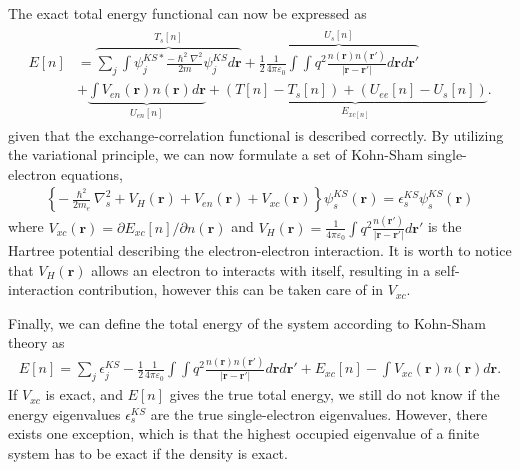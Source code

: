 The exact total energy functional can now be expressed as
\begin{align}
  \begin{aligned}
  E[n]
  &= \overbrace{\sum_j \int \psi_j^{KS*} \frac{-\hslash^2\nabla^2}{2m} \psi_j^{KS}d\boldsymbol{r}}^{T_s[n]} + \overbrace{\frac{1}{2}\frac{1}{4\pi\varepsilon_0}\int \int q^2\frac{n(\boldsymbol{r})n(\boldsymbol{r}')}{\lvert \boldsymbol{r}-\boldsymbol{r}'\rvert} d\boldsymbol{r}d\boldsymbol{r}'}^{U_s[n]}
  \\ &+ \underbrace{\int V_{en}(\boldsymbol{r})n(\boldsymbol{r})d\boldsymbol{r}}_{U_{en}[n]} + \underbrace{\left(T[n] - T_s[n] \right) + \left( U_{ee}[n] - U_s[n] \right)}_{E_{xc[n]}}.
  \end{aligned}
\end{align}
given that the exchange-correlation functional is described correctly. By utilizing the variational principle, we can now formulate a set of Kohn-Sham single-electron equations,
\begin{align}
  \left\{ -\frac{\hslash^2}{2m_e}\nabla^2_s + V_H(\boldsymbol{r}) + V_{en}(\boldsymbol{r}) + V_{xc}(\boldsymbol{r}) \right\} \psi_s^{KS}(\boldsymbol{r}) = \epsilon_s^{KS} \psi_s^{KS}(\boldsymbol{r})
  \label{eq:singleKS}
\end{align}
where $V_{xc}(\boldsymbol{r})=\partial E_{xc}[n]/\partial n(\boldsymbol{r})$ and $V_{H}(\boldsymbol{r})=\frac{1}{4\pi\varepsilon_0}\int q^2 \frac{n(\boldsymbol{r'})}{\lvert \boldsymbol{r} - \boldsymbol{r}'\rvert} d\boldsymbol{r}'$ is the Hartree potential describing the electron-electron interaction.
It is worth to notice that $V_H(\boldsymbol{r})$ allows an electron to interacts with itself, resulting in a self-interaction contribution, however this can be taken care of in $V_{xc}$.

Finally, we can define the total energy of the system according to Kohn-Sham theory as
\begin{align}
  E[n] = \sum_{j}\epsilon_j^{KS}-\frac{1}{2}\frac{1}{4\pi\varepsilon_0}\int \int q^2 \frac{n(\boldsymbol{r})n(\boldsymbol{r}')}{\lvert \boldsymbol{r} - \boldsymbol{r}' \rvert} d\boldsymbol{r}d\boldsymbol{r}' + E_{xc}[n] - \int V_{xc}(\boldsymbol{r})n(\boldsymbol{r})d\boldsymbol{r}.
\end{align}
If $V_{xc}$ is exact, and $E[n]$ gives the true total energy, we still do not know if the energy eigenvalues $\epsilon_s^{KS}$ are the true single-electron eigenvalues. However, there exists one exception, which is that the highest occupied eigenvalue of a finite system has to be exact if the density is exact.

